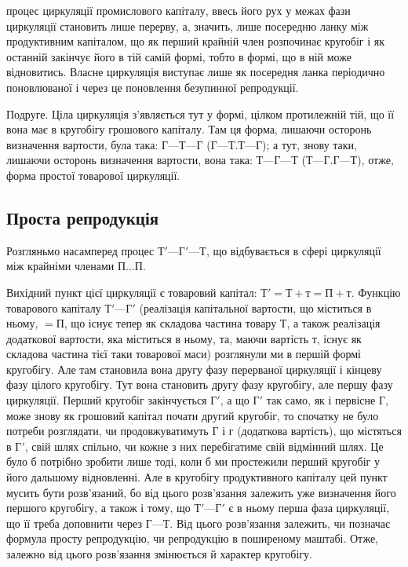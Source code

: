 \parcont{}  %
процес циркуляції промислового капіталу, ввесь його рух у межах фази
циркуляції становить лише перерву, а, значить, лише посередню ланку між
продуктивним капіталом, що як перший крайній член розпочинає кругобіг
і як останній закінчує його в тій самій формі, тобто в формі, що в ній
може відновитись. Власне циркуляція виступає лише як посередня ланка
періодично поновлюваної і через це поновлення безупинної репродукції.

Подруге. Ціла циркуляція з'являється тут у формі, цілком протилежній
тій, що її вона має в кругобігу грошового капіталу. Там ця форма,
лишаючи осторонь визначення вартости, була така: $Г — Т — Г$ ($Г — Т.Т — Г$);
а тут, знову таки, лишаючи осторонь визначення вартости, вона
така: $Т — Г — Т$ ($Т — Г. Г — Т$), отже, форма простої товарової циркуляції.

\subsection{Проста репродукція}

Розгляньмо насамперед процес $Т' — Г' — Т$, що відбувається в сфері
циркуляції між крайніми членами $П\dots{}П$.

Вихідний пункт цієї циркуляції є товаровий капітал: $Т' = Т + т
= П + т$. Функцію товарового капіталу $Т' — Г'$ (реалізація капітальної вартости,
що міститься в ньому, $= П$, що існує тепер як складова частина
товару $Т$, а також реалізація додаткової вартости, яка міститься в
ньому, та, маючи вартість $т$, існує як складова частина тієї таки
товарової маси) розглянули ми в першій формі кругобігу. Але там становила
вона другу фазу перерваної циркуляції і кінцеву фазу цілого кругобігу.
Тут вона становить другу фазу кругобігу, але першу фазу циркуляції.
Перший кругобіг закінчується $Г'$, а що $Г'$ так само, як і первісне
$Г$, може знову як грошовий капітал почати другий кругобіг, то спочатку
не було потреби розглядати, чи продовжуватимуть $Г$ і $г$ (додаткова
вартість), що містяться в $Г'$, свій шлях спільно, чи кожне з них перебігатиме
свій відмінний шлях. Це було б потрібно зробити лише тоді,
коли б ми простежили перший кругобіг у його дальшому відновленні.
Але в кругобігу продуктивного капіталу цей пункт мусить бути розв’язаний,
бо від цього розв’язання залежить уже визначення його першого
кругобігу, а також і тому, що $Т' — Г'$ є в ньому перша фаза циркуляції,
що її треба доповнити через $Г — Т$. Від цього розв’язання залежить,
чи позначає формула просту репродукцію, чи репродукцію в поширеному
маштабі. Отже, залежно від цього розв’язання змінюється й характер
кругобігу.

